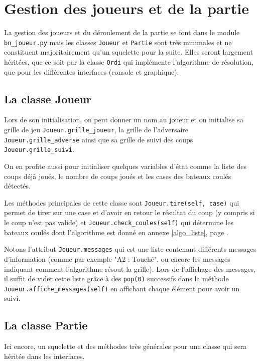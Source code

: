 \chapter{Gestion des joueurs et de la partie}\label{chap_joueurs}

La gestion des joueurs et du déroulement de la partie se font dans le module \texttt{bn\_joueur.py} mais les classes \texttt{Joueur} et \texttt{Partie} sont très minimales et ne constituent majoritairement qu'un squelette pour la suite. Elles seront largement héritées, que ce soit par la classe \texttt{Ordi} qui implémente l'algorithme de résolution, que pour les différentes interfaces (console et graphique).

\section{La classe Joueur}
Lors de son initialisation, on peut donner un nom au joueur et on initialise sa grille de jeu \texttt{Joueur.grille\_joueur}, la grille de l'adversaire \texttt{Joueur.grille\_adverse} ainsi que sa grille de suivi des coups \texttt{Joueur.grille\_suivi}.

On en profite aussi pour initialiser quelques variables d'état comme la liste des coups déjà joués, le nombre de coups joués et les cases des bateaux coulés détectés.

Les méthodes principales de cette classe sont \texttt{Joueur.tire(self, case)} qui permet de tirer sur une case et d'avoir en retour le résultat du coup (y compris si le coup n'est pas valide) et \texttt{Joueur.check\_coules(self)} qui détermine les bateaux coulés dont l'algorithme est donné en annexe \ref{algo_liste}, page \pageref{check_coules}. 

\medskip



Notons l'attribut \texttt{Joueur.messages} qui est une liste contenant différents messages d'information (comme par exemple "A2 : Touché", ou encore les messages indiquant comment l'algorithme résout la grille). Lors de l'affichage des messages, il suffit de vider cette liste grâce à des \texttt{pop(0)} successifs dans la méthode \texttt{Joueur.affiche\_messages(self)} en affichant chaque élément pour avoir un suivi.

\section{La classe Partie}
Ici encore, un squelette et des méthodes très générales pour une classe qui sera héritée dans les interfaces.

